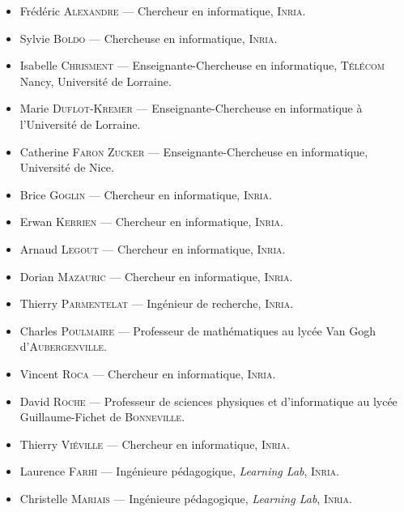 {\small
\begin{itemize}\jazzitem
\item Frédéric \textsc{Alexandre} --- Chercheur en informatique, \textsc{Inria}.
\item Sylvie \textsc{Boldo} --- Chercheuse en informatique, \textsc{Inria}.
\item Isabelle \textsc{Chrisment} --- Enseignante-Chercheuse en informatique, \textsc{Télécom} Nancy, Université de Lorraine.
\item Marie \textsc{Duflot-Kremer} --- Enseignante-Chercheuse en informatique à l'Université de Lorraine.
\item Catherine \textsc{Faron Zucker} --- Enseignante-Chercheuse en informatique, Université de Nice.
\item Brice \textsc{Goglin} --- Chercheur en informatique, \textsc{Inria}.
\item Erwan \textsc{Kerrien} --- Chercheur en informatique, \textsc{Inria}.
\item Arnaud \textsc{Legout} --- Chercheur en informatique, \textsc{Inria}.
\item Dorian \textsc{Mazauric} --- Chercheur en informatique, \textsc{Inria}.
\item Thierry \textsc{Parmentelat} --- Ingénieur de recherche, \textsc{Inria}.
\item Charles \textsc{Poulmaire} --- Professeur de mathématiques au lycée Van Gogh d'\textsc{Aubergenville}.
\item Vincent \textsc{Roca} --- Chercheur en informatique, \textsc{Inria}.
\item David \textsc{Roche} --- Professeur de sciences physiques et d'informatique au lycée Guillaume-Fichet de \textsc{Bonneville}.
\item Thierry \textsc{Viéville} --- Chercheur en informatique, \textsc{Inria}.
\end{itemize}}


{\small
\begin{itemize}\jazzitem
\item Laurence \textsc{Farhi} --- Ingénieure pédagogique, \textit{Learning Lab}, \textsc{Inria}.
\item Christelle \textsc{Mariais} --- Ingénieure pédagogique, \textit{Learning Lab}, \textsc{Inria}.
\end{itemize}}



